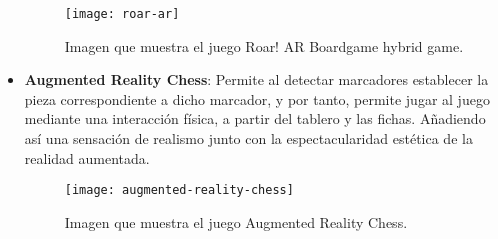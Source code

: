 \begin{itemize}
  \begin{figure}[h]
    \centering
    \texttt{[image: roar-ar]}
    \caption{Imagen que muestra el juego Roar! AR Boardgame hybrid game.\protect\footnotemark}
    \label{figura-roar-ar}
  \end{figure}


  \item \textbf{Augmented Reality Chess}: Permite al detectar marcadores establecer la pieza correspondiente a dicho marcador, y por tanto, permite jugar al juego mediante una interacción física, a partir del tablero y las fichas. Añadiendo así una sensación de realismo junto con la espectacularidad estética de la realidad aumentada.

  \begin{figure}[h]
    \centering
    \texttt{[image: augmented-reality-chess]}
    \caption{Imagen que muestra el juego Augmented Reality Chess.\protect\footnotemark}
    \label{figura-augmented-reality-chess}
  \end{figure}


\end{itemize}

